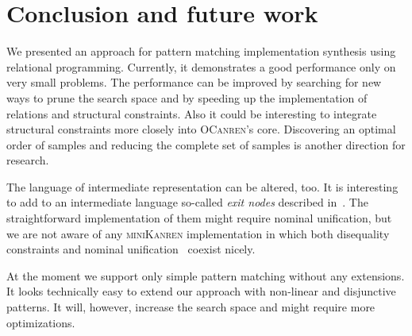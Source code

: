 \section{Conclusion and future work}

We presented an approach for pattern matching implementation synthesis using relational programming. Currently, it demonstrates a good performance only
on very small problems. The performance can be improved by searching for new ways to prune the search space and by speeding up the implementation of
relations and structural constraints. Also it could be interesting to integrate structural constraints more closely into \textsc{OCanren}'s core.
Discovering an optimal order of samples and reducing the complete set of samples is another direction for research.

The language of intermediate representation can be altered, too. It is interesting to add to an intermediate language so-called \emph{exit nodes}
described in~\cite{maranget2001}. The straightforward implementation of them might require nominal unification, but we are not aware of any
\textsc{miniKanren} implementation in which both disequality constraints and nominal unification~\cite{alphaKanren} coexist nicely.

At the moment we support only simple pattern matching without any extensions. It looks technically easy to extend our approach with
non-linear and disjunctive patterns. It will, however, increase the search space and might require more optimizations.



